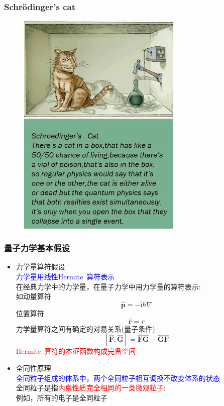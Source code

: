 \documentclass[cjk,slidestop,compress,mathserif,blue]{beamer}
\begin{document}
\frame
{
	\frametitle{Schr\"odinger's cat}
\begin{figure}[h!]
\centering
\vspace{-10.5pt}
\includegraphics[height=0.70\textwidth,width=0.7\textwidth,viewport=0 0 760 750,clip]{Figures/Schrodinger-cat.jpg}
\label{Schrodinger-cat}
\end{figure}
}

\frame
{
	\frametitle{量子力学基本假设}
	\begin{itemize}
		\item 力学量算符假设\\
			\textcolor{blue}{力学量用线性\textrm{Hermite~}算符表示}\\
			在经典力学中的力学量，在量子力学中用力学量的算符表示:\\如动量算符 
			$$\hat{\mathbf{p}}=-\mathrm{i}\hbar\nabla$$
			位置算符$$\hat{\mathbf r}=r$$
			力学量算符之间有确定的对易关系(量子条件)
			$$[\hat{\mathbf F},\hat{\mathbf G}]=\hat{\mathbf F}\hat{\mathbf G}-\hat{\mathbf G}\hat{\mathbf F}$$ 
			\textcolor{red}{\textrm{Hermite~}算符的本征函数构成完备空间}
		\item 全同性原理\\
			\textcolor{blue}{全同粒子组成的体系中，两个全同粒子相互调换不改变体系的状态}\\ 
			全同粒子是指\textcolor{red}{内禀性质完全相同的一类微观粒子}:\\例如，所有的电子是全同粒子 
	\end{itemize}
}

\end{document}
